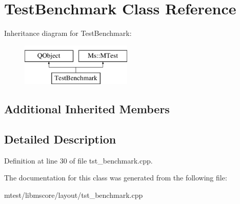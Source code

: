 \hypertarget{class_test_benchmark}{}\section{Test\+Benchmark Class Reference}
\label{class_test_benchmark}
Inheritance diagram for Test\+Benchmark\+:\begin{figure}[H]
\begin{center}
\leavevmode
\includegraphics[height=2.000000cm]{class_test_benchmark}
\end{center}
\end{figure}
\subsection*{Additional Inherited Members}


\subsection{Detailed Description}


Definition at line 30 of file tst\+\_\+benchmark.\+cpp.



The documentation for this class was generated from the following file\+:\begin{DoxyCompactItemize}
\item 
mtest/libmscore/layout/tst\+\_\+benchmark.\+cpp\end{DoxyCompactItemize}
